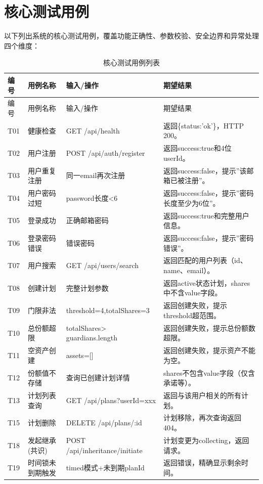 \documentclass[UTF8,a4paper,zihao=-4,openany]{ctexrep}
\begin{document}
\section{核心测试用例}

以下列出系统的核心测试用例，覆盖功能正确性、参数校验、安全边界和异常处理四个维度：

\setlength{\extrarowheight}{3pt}
\begin{longtable}{p{1.3cm}p{3.2cm}p{4.2cm}p{5.5cm}}
\caption{核心测试用例列表}\\
\toprule
编号 & 用例名称 & 输入/操作 & 期望结果\\
\midrule
\endfirsthead
\toprule
编号 & 用例名称 & 输入/操作 & 期望结果\\
\midrule
\endhead
T01 & 健康检查 & GET /api/health & 返回\{status:'ok'\}，HTTP 200。\\
T02 & 用户注册 & POST /api/auth/register & 返回success:true和4位userId。\\
T03 & 用户重复注册 & 同一email再次注册 & 返回success:false，提示”该邮箱已被注册”。\\
T04 & 用户密码过短 & password长度<6 & 返回success:false，提示”密码长度至少为6位”。\\
T05 & 登录成功 & 正确邮箱密码 & 返回success:true和完整用户信息。\\
T06 & 登录密码错误 & 错误密码 & 返回success:false，提示”密码错误”。\\
T07 & 用户搜索 & GET /api/users/search & 返回匹配的用户列表（id、name、email）。\\
T08 & 创建计划 & 完整计划参数 & 返回active状态计划，shares中不含value字段。\\
T09 & 门限非法 & threshold=4,totalShares=3 & 返回创建失败，提示threshold超范围。\\
T10 & 总份额超限 & totalShares> guardians.length & 返回创建失败，提示总份额数超限。\\
T11 & 空资产创建 & assets=[] & 返回创建失败，提示资产不能为空。\\
T12 & 份额值不存储 & 查询已创建计划详情 & shares不包含value字段（仅含承诺等）。\\
T13 & 计划列表查询 & GET /api/plans?userId=xxx & 返回与该用户相关的所有计划。\\
T15 & 计划删除 & DELETE /api/plans/:id & 计划移除，再次查询返回404。\\
T18 & 发起继承(共识) & POST /api/inheritance/initiate & 计划变更为collecting，返回请求。\\
T19 & 时间锁未到期触发 & timed模式+未到期planId & 返回错误，精确显示剩余时间。\\

\end{longtable}
\end{document}
